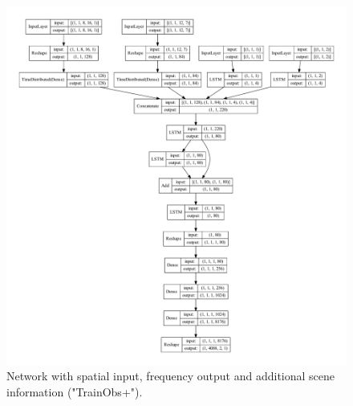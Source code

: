 \documentclass[sigconf]{acmart}
\begin{document}
\begin{figure}
	\includegraphics[width=\textwidth]{imgs/model_allinps.pdf}
	\caption{Network with spatial input, frequency output and additional scene information ("TrainObs+").}
	\label{allInputsNet}
\end{figure}
\end{document}
